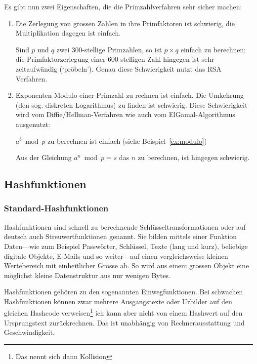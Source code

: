 Es gibt nun zwei Eigenschaften, die die Primzahlverfahren sehr sicher machen:
\begin{enumerate}
    \item Die Zerlegung von grossen Zahlen in ihre Primfaktoren ist schwierig,
    die Multiplikation dagegen ist einfach.

    Sind $p$ und $q$ zwei 300-stellige Primzahlen, so ist $p\times q$ einfach
    zu berechnen; die Primfaktorzerlegung einer 600-stelligen Zahl hingegen
    ist sehr zeitaufwändig (`pröbeln'). Genau diese Schwierigkeit nutzt
    das RSA Verfahren.

    \item Exponenten Modulo einer Primzahl zu rechnen ist einfach.
    Die Umkehrung (den sog. diskreten Logarithmus) zu finden ist schwierig.
    Diese Schwierigkeit wird vom Diffie/Hellman-Verfahren wie auch vom
    ElGamal-Algorithmus ausgenutzt:

    $a^b \bmod p$ zu berechnen ist einfach (siehe Beispiel~\ref{ex:modulo})

    Aus der Gleichung $a^n \bmod p = s$ das $n$ zu berechnen, ist hingegen schwierig.
\end{enumerate}

\subsection{Hashfunktionen}
\label{subsec:hash}

\subsubsection*{Standard-Hashfunktionen}

Hashfunktionen sind schnell zu berechnende Schlüsseltransformationen oder
auf deutsch auch Streuwertfunktionen genannt. Sie bilden mittels einer
Funktion Daten---wie zum Beispiel Passwörter, Schlüssel, Texte (lang
und kurz), beliebige digitale Objekte, E-Mails und so weiter---auf
einen vergleichsweise kleinen Wertebereich mit einheitlicher Grösse
ab. So wird aus einem grossen Objekt eine möglichst kleine Datenstruktur
aus nur wenigen Bytes.

Hashfunktionen gehören zu den sogenannten Einwegfunktionen. Bei
schwachen Hashfunktionen können zwar mehrere Ausgangstexte oder
Urbilder auf den gleichen Hashcode verweisen\footnote{Das nennt sich dann
Kollision} ich kann aber nicht von einem Hashwert auf den
Ursprungstext zurückrechnen. Das ist unabhängig von Rechnerausstattung
und Geschwindigkeit.

